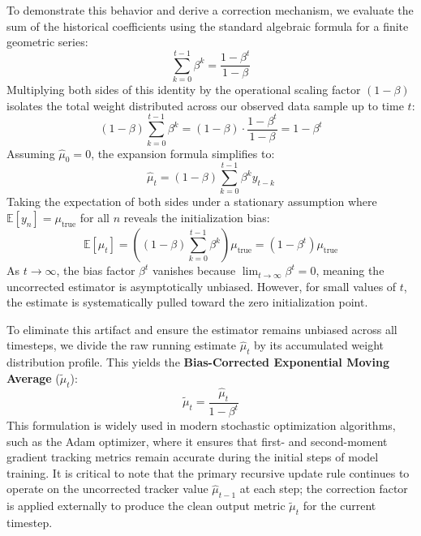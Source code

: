\documentclass{article}
\begin{document}
To demonstrate this behavior and derive a correction mechanism, we evaluate the sum of the historical coefficients using the standard algebraic formula for a finite geometric series:
\begin{equation}
\sum_{k=0}^{t-1} \beta^k = \frac{1 - \beta^t}{1 - \beta}
\end{equation}
Multiplying both sides of this identity by the operational scaling factor $(1 - \beta)$ isolates the total weight distributed across our observed data sample up to time $t$:
\begin{equation}
(1 - \beta) \sum_{k=0}^{t-1} \beta^k = (1 - \beta) \cdot \frac{1 - \beta^t}{1 - \beta} = 1 - \beta^t
\end{equation}
Assuming $\hat{\mu}_0 = 0$, the expansion formula simplifies to:
\begin{equation}
\hat{\mu}_t = (1 - \beta) \sum_{k=0}^{t-1} \beta^k y_{t-k}
\end{equation}
Taking the expectation of both sides under a stationary assumption where $\mathbb{E}[y_n] = \mu_{\text{true}}$ for all $n$ reveals the initialization bias:
\begin{equation}
\mathbb{E}[\hat{\mu}_t] = \left( (1 - \beta) \sum_{k=0}^{t-1} \beta^k \right) \mu_{\text{true}} = \left( 1 - \beta^t \right) \mu_{\text{true}}
\end{equation}
As $t \to \infty$, the bias factor $\beta^t$ vanishes because $\lim_{t \to \infty} \beta^t = 0$, meaning the uncorrected estimator is asymptotically unbiased. However, for small values of $t$, the estimate is systematically pulled toward the zero initialization point.

To eliminate this artifact and ensure the estimator remains unbiased across all timesteps, we divide the raw running estimate $\hat{\mu}_t$ by its accumulated weight distribution profile. This yields the \textbf{Bias-Corrected Exponential Moving Average} ($\tilde{\mu}_t$):
\begin{equation}
\tilde{\mu}_t = \frac{\hat{\mu}_t}{1 - \beta^t}
\end{equation}
This formulation is widely used in modern stochastic optimization algorithms, such as the Adam optimizer, where it ensures that first- and second-moment gradient tracking metrics remain accurate during the initial steps of model training. It is critical to note that the primary recursive update rule continues to operate on the uncorrected tracker value $\hat{\mu}_{t-1}$ at each step; the correction factor is applied externally to produce the clean output metric $\tilde{\mu}_t$ for the current timestep.
\end{document}
